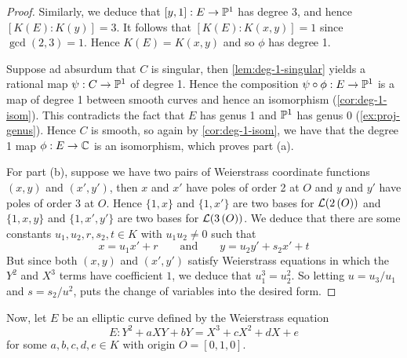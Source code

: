 \begin{proof}
	Similarly,
	we deduce that $[y, 1]: E \to \mathbb{P}^1$ 
	has degree 3, and hence $[K(E): K(y)] = 3$.
	It follows that $[K(E): K(x, y)] = 1$ since $\gcd(2, 3) = 1$.
	Hence $K(E) = K(x, y)$ and so $\phi$ has degree 1.

	Suppose ad absurdum that $C$ is singular, then \ref{lem:deg-1-singular}
	yields a rational map $\psi: C \to \mathbb{P}^1$ of degree 1. Hence
	the composition $\psi\circ\phi: E \to \mathbb{P}^1$ is a map of degree 1 between
	smooth curves and hence an isomorphism (\ref{cor:deg-1-isom}).
	This contradicts the fact that $E$ has genus 1 and $\mathbb{P}^1$ has genus 0
	(\ref{ex:proj-genus}). Hence $C$ is smooth, so again by
	\ref{cor:deg-1-isom},
	we have that the degree 1 map $\phi: E \to \mathbb{C}$ is
	an isomorphism, which proves part (a).

	For part (b), suppose we have two pairs of Weierstrass coordinate functions
	$(x, y)$ and $(x', y')$, then $x$ and $x'$ have poles of order 2 at $O$
	and $y$ and $y'$ have poles of order 3 at $O$.
	Hence $\{1, x\}$ and $\{1, x'\}$ are two bases for $\mathcal{L}(2\,(O))$
	and $\{1, x, y\}$ and $\{1, x', y'\}$ are two bases for
	$\mathcal{L}(3\,(O))$. We deduce that there are some constants
	$u_1, u_2, r, s_2, t \in K$ with $u_1u_2 \neq 0$ such that
	\begin{equation*}
		x = u_1x' + r\qquad\textrm{and}\qquad y= u_2y' + s_2x' + t
	\end{equation*}
	But since both $(x, y)$ and $(x', y')$ satisfy Weierstrass equations in
	which the $Y^2$ and $X^3$ terms have coefficient $1$, we deduce that
	$u_1^3 = u_2^2$. So letting $u = u_3/u_1$ and $s = s_2/u^2$, puts the change
	of variables into the desired form.
\end{proof}


Now, let $E$ be an elliptic curve defined by the Weierstrass equation
\begin{equation}
	\label{weierstrass-eq}
	E: Y^2 + aXY + bY = X^3 + cX^2 + dX + e
\end{equation}
for some $a, b, c, d, e \in K$ with origin $O = [0, 1, 0]$.

